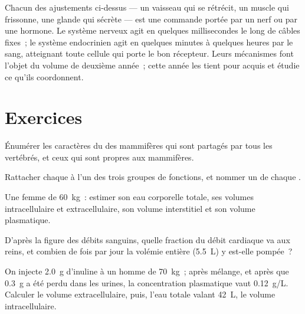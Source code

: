 \begin{remark}[Coordination]\label{rem:b1:mammal-organization:coordination}
Chacun des ajustements ci-dessus --- un vaisseau qui se rétrécit, un
muscle qui frissonne, une glande qui sécrète --- est une commande portée
par un nerf ou par une hormone. Le système nerveux agit en quelques
millisecondes le long de câbles fixes~; le système endocrinien agit en
quelques minutes à quelques heures par le sang, atteignant toute cellule
qui porte le bon récepteur. Leurs mécanismes font l'objet du volume de
deuxième année~; cette année les tient pour acquis et étudie ce qu'ils
coordonnent.
\end{remark}

\section{Exercices}

\begin{exercise}[$\star$]\label{exo:b1:mammal-organization:1}
Énumérer les caractères du  des mammifères qui sont
partagés par tous les vertébrés, et ceux qui sont propres aux
mammifères.
\end{exercise}

\begin{exercise}[$\star$]\label{exo:b1:mammal-organization:2}
Rattacher chaque  à l'un des trois groupes de fonctions, et
nommer un  de chaque .
\end{exercise}

\begin{exercise}[$\star$]\label{exo:b1:mammal-organization:3}
Une femme de \qty{60}{kg}~: estimer son eau corporelle totale, ses
volumes intracellulaire et extracellulaire, son volume interstitiel et
son volume plasmatique.
\end{exercise}

\begin{exercise}[$\star$]\label{exo:b1:mammal-organization:4}
D'après la figure des débits sanguins, quelle fraction du débit
cardiaque va aux reins, et combien de fois par jour la volémie entière
(\qty{5.5}{L}) y est-elle pompée~?
\end{exercise}

\begin{exercise}[$\star\star$]\label{exo:b1:mammal-organization:5}
On injecte \qty{2.0}{g} d'inuline à un homme de \qty{70}{kg}~; après
mélange, et après que \qty{0.3}{g} a été perdu dans les urines, la
concentration plasmatique vaut \qty{0.12}{g/L}. Calculer le volume
extracellulaire, puis, l'eau totale valant \qty{42}{L}, le volume
intracellulaire.
\end{exercise}

